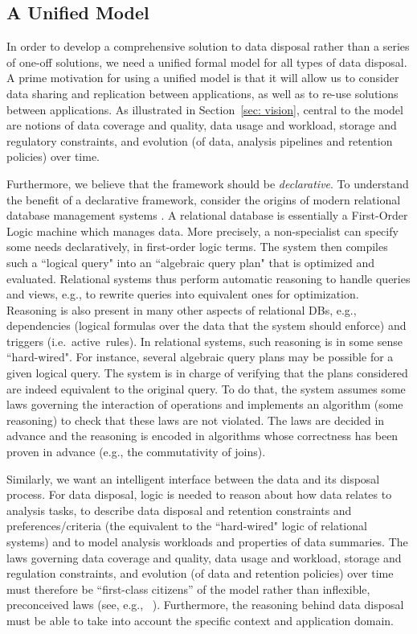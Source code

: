 \documentclass[11pt,dvipdfm]{article}
\begin{document}
\subsection{A Unified Model}
\label{ssec: model}

In order to develop a comprehensive solution to data disposal rather than a series of one-off solutions, we need a unified formal model for all types of data disposal. 
A prime motivation for using a unified model is that it will allow us to consider data sharing and replication between applications, as well as to re-use solutions between applications.  
As illustrated in Section~\ref{sec: vision},
central to the model are notions of data coverage and quality, data usage and workload, storage and
regulatory constraints, and evolution (of data, analysis pipelines  and retention policies) over time.

Furthermore, we believe that the framework should be {\em declarative}. To understand the benefit of a declarative framework, consider the origins of modern relational database management systems \cite{codd70}.
A relational database is essentially a First-Order Logic machine which manages data. More precisely, a
non-specialist can specify some needs declaratively, in first-order
logic terms. The system then compiles such a ``logical query" into
an ``algebraic query plan" that is optimized and evaluated.
Relational systems thus perform automatic reasoning to handle
queries and views, e.g., to rewrite queries into equivalent ones for
optimization. Reasoning is also present in many other aspects of
relational DBs, e.g., dependencies (logical formulas over the data
that the system should enforce) and triggers \mbox{(i.e. active
rules).} In relational systems, such reasoning is in some sense
``hard-wired". For instance, several algebraic query plans may be
possible for a given logical query. The system is in charge of
verifying that the plans considered are indeed equivalent to the
original query. To do that, the system assumes some laws governing
the interaction of operations and implements an algorithm (some
reasoning) to check that these laws are not violated. The laws are
decided in advance and the reasoning is encoded in algorithms whose
correctness has been proven in advance (e.g., the commutativity of joins).

Similarly, we want an intelligent interface between the data and its
disposal process. For data disposal, logic is needed to reason about how 
data relates to analysis tasks, to describe data disposal
and retention constraints and preferences/criteria (the equivalent
to the ``hard-wired" logic of relational systems) and to model
analysis workloads and properties of data summaries.  The laws governing data coverage and
quality, data usage and workload, storage and regulation
constraints, and evolution (of data and retention policies) over
time must therefore be ``first-class citizens'' of the model rather than
inflexible, preconceived laws  (see, e.g., ~\cite{DBLP:conf/ithings/SarkarBRM18}).
Furthermore, the reasoning behind data disposal must be able to take into account the specific context and application domain.
\end{document}
